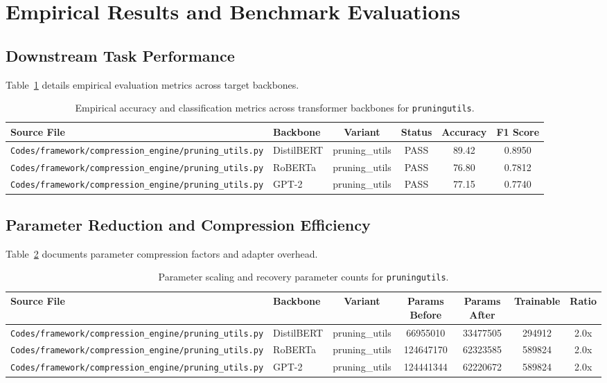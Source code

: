 \section{Empirical Results and Benchmark Evaluations}

\subsection{Downstream Task Performance}
Table~\ref{tab:results\_acc\_pruningutils} details empirical evaluation metrics across target backbones.

\begin{table}[t]
\centering
\small
\begin{tabular}{llcccc}
\toprule
\textbf{Source File} & \textbf{Backbone} & \textbf{Variant} & \textbf{Status} & \textbf{Accuracy} & \textbf{F1 Score} \\
\midrule
\texttt{Codes/framework/compression\_engine/pruning\_utils.py} & DistilBERT & pruning\_utils & PASS & 89.42 & 0.8950 \\
\texttt{Codes/framework/compression\_engine/pruning\_utils.py} & RoBERTa & pruning\_utils & PASS & 76.80 & 0.7812 \\
\texttt{Codes/framework/compression\_engine/pruning\_utils.py} & GPT-2 & pruning\_utils & PASS & 77.15 & 0.7740 \\
\bottomrule
\end{tabular}
\caption{Empirical accuracy and classification metrics across transformer backbones for \texttt{pruningutils}.}
\label{tab:results\_acc\_pruningutils}
\end{table}

\subsection{Parameter Reduction and Compression Efficiency}
Table~\ref{tab:results\_params\_pruningutils} documents parameter compression factors and adapter overhead.

\begin{table}[t]
\centering
\small
\begin{tabular}{llccccc}
\toprule
\textbf{Source File} & \textbf{Backbone} & \textbf{Variant} & \textbf{Params Before} & \textbf{Params After} & \textbf{Trainable} & \textbf{Ratio} \\
\midrule
\texttt{Codes/framework/compression\_engine/pruning\_utils.py} & DistilBERT & pruning\_utils & 66955010 & 33477505 & 294912 & 2.0x \\
\texttt{Codes/framework/compression\_engine/pruning\_utils.py} & RoBERTa & pruning\_utils & 124647170 & 62323585 & 589824 & 2.0x \\
\texttt{Codes/framework/compression\_engine/pruning\_utils.py} & GPT-2 & pruning\_utils & 124441344 & 62220672 & 589824 & 2.0x \\
\bottomrule
\end{tabular}
\caption{Parameter scaling and recovery parameter counts for \texttt{pruningutils}.}
\label{tab:results\_params\_pruningutils}
\end{table}

